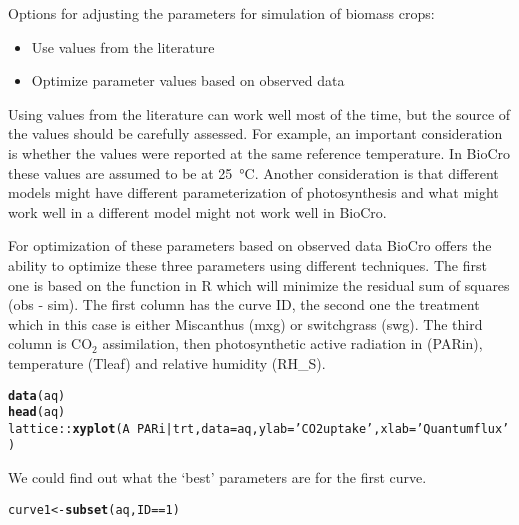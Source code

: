 \documentclass[12pt]{article}\usepackage[]{graphicx}\usepackage[]{color}
\makeatletter
\newcommand{\hlnum}[1]{\textcolor[rgb]{0.686,0.059,0.569}{#1}}%
\newcommand{\hlstr}[1]{\textcolor[rgb]{0.192,0.494,0.8}{#1}}%
\newcommand{\hlopt}[1]{\textcolor[rgb]{0,0,0}{#1}}%
\newcommand{\hlstd}[1]{\textcolor[rgb]{0.345,0.345,0.345}{#1}}%
\newcommand{\hlkwb}[1]{\textcolor[rgb]{0.69,0.353,0.396}{#1}}%
\newcommand{\hlkwc}[1]{\textcolor[rgb]{0.333,0.667,0.333}{#1}}%
\newcommand{\hlkwd}[1]{\textcolor[rgb]{0.737,0.353,0.396}{\textbf{#1}}}%
\newenvironment{kframe}{%
 \def\at@end@of@kframe{}%
 \ifinner\ifhmode%
  \def\at@end@of@kframe{\end{minipage}}%
  \begin{minipage}{\columnwidth}%
 \fi\fi%
 \def\FrameCommand##1{\hskip\@totalleftmargin \hskip-\fboxsep
 \colorbox{shadecolor}{##1}\hskip-\fboxsep
     \hskip-\linewidth \hskip-\@totalleftmargin \hskip\columnwidth}%
 \MakeFramed {\advance\hsize-\width
   \@totalleftmargin\z@ \linewidth\hsize
   \@setminipage}}%
 {\par\unskip\endMakeFramed%
 \at@end@of@kframe}
\newenvironment{knitrout}{}{} %
\makeatother
\begin{document}
Options for adjusting the parameters for simulation of biomass crops:

\begin{itemize}
\item Use values from the literature
\item Optimize parameter values based on observed data
\end{itemize}
      
Using values from the literature can work well most of the time, but
the source of the values should be carefully assessed. For example, an
important consideration is whether the values were reported at the
same reference temperature. In BioCro these values are assumed to be
at \SI{25}{\degreeCelsius}. Another consideration is that different models might have
different parameterization of photosynthesis and what might work well
in a different model might not work well in BioCro.
      
For optimization of these parameters based on observed data BioCro
offers the ability to optimize these three parameters using different
techniques. The first one is based on the  function in R
which will minimize the residual sum of squares (obs - sim). The first
column has the curve ID, the second one the treatment which in this
case is either Miscanthus (mxg) or switchgrass (swg). The third column
is CO$_2$ assimilation, then photosynthetic active radiation in
(PARin), temperature (Tleaf) and relative humidity (RH\_S).
      
\begin{knitrout}
\color{fgcolor}\begin{kframe}
\begin{alltt}
\hlkwd{data}\hlstd{(aq)}
\hlkwd{head}\hlstd{(aq)}
\hlstd{lattice}\hlopt{::}\hlkwd{xyplot}\hlstd{(A} \hlopt{~} \hlstd{PARi} \hlopt{|} \hlstd{trt,} \hlkwc{data}\hlstd{=aq,} \hlkwc{ylab}\hlstd{=}\hlstr{'CO2 uptake'}\hlstd{,} \hlkwc{xlab}\hlstd{=}\hlstr{'Quantum flux'}\hlstd{)}
\end{alltt}
\end{kframe}
\end{knitrout}

We could find out what the `best' parameters are for the first curve.

\begin{knitrout}
\color{fgcolor}\begin{kframe}
\begin{alltt}
\hlstd{curve1} \hlkwb{<-} \hlkwd{subset}\hlstd{(aq, ID} \hlopt{==} \hlnum{1}\hlstd{)}
\end{alltt}
\end{kframe}
\end{knitrout}
\end{document}
